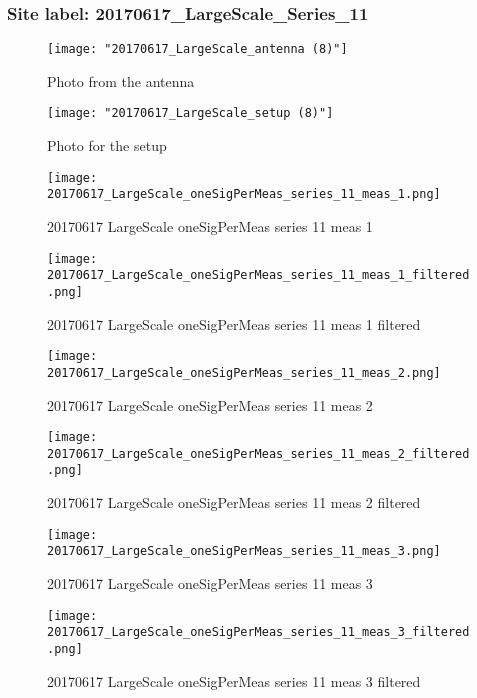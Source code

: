 \subsubsection{Site label: 20170617\_LargeScale\_Series\_11}
\begin{figure}[ht] \caption{Photo from the antenna}
\texttt{[image: "20170617\_LargeScale\_antenna (8)"]}\centering\end{figure}
\begin{figure}[ht] \caption{Photo for the setup}
\texttt{[image: "20170617\_LargeScale\_setup (8)"]}\centering\end{figure}
\begin{figure}[ht] \caption{20170617 LargeScale oneSigPerMeas series 11 meas 1}
\texttt{[image: 20170617\_LargeScale\_oneSigPerMeas\_series\_11\_meas\_1.png]}\centering\end{figure}
\begin{figure}[ht] \caption{20170617 LargeScale oneSigPerMeas series 11 meas 1 filtered}
\texttt{[image: 20170617\_LargeScale\_oneSigPerMeas\_series\_11\_meas\_1\_filtered.png]}\centering\end{figure}
\begin{figure}[ht] \caption{20170617 LargeScale oneSigPerMeas series 11 meas 2}
\texttt{[image: 20170617\_LargeScale\_oneSigPerMeas\_series\_11\_meas\_2.png]}\centering\end{figure}
\begin{figure}[ht] \caption{20170617 LargeScale oneSigPerMeas series 11 meas 2 filtered}
\texttt{[image: 20170617\_LargeScale\_oneSigPerMeas\_series\_11\_meas\_2\_filtered.png]}\centering\end{figure}
\begin{figure}[ht] \caption{20170617 LargeScale oneSigPerMeas series 11 meas 3}
\texttt{[image: 20170617\_LargeScale\_oneSigPerMeas\_series\_11\_meas\_3.png]}\centering\end{figure}
\begin{figure}[ht] \caption{20170617 LargeScale oneSigPerMeas series 11 meas 3 filtered}
\texttt{[image: 20170617\_LargeScale\_oneSigPerMeas\_series\_11\_meas\_3\_filtered.png]}\centering\end{figure}
\clearpage
